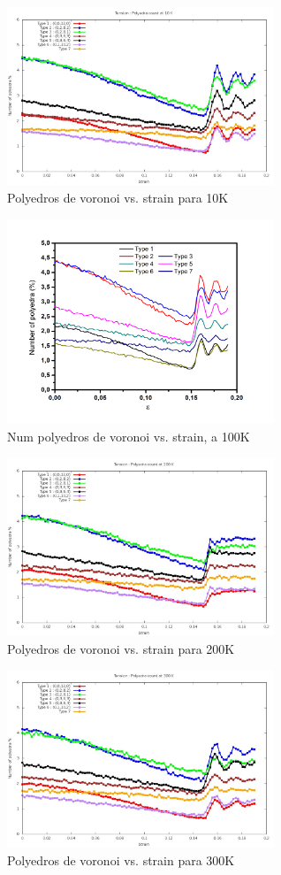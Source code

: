 \documentclass[10pt, oneside]{article} %
\begin{document}
\begin{figure}[H]
\centering
\includegraphics[width=8cm]{Figures/Tens_Polyedra_10K.jpeg}
\caption{Polyedros de voronoi vs. strain para 10K}
\end{figure}

\begin{figure}[H]
\centering
\includegraphics[width=8cm]{Figures/Polyedra_Vs_Strain_100K_TEN.png}
\caption{Num polyedros de voronoi vs. strain, a 100K}
\end{figure}

\begin{figure}[H]
\centering
\includegraphics[width=8cm]{Figures/Tens_Polyedra_200K.jpeg}
\caption{Polyedros de voronoi vs. strain para 200K}
\end{figure}

\begin{figure}[H]
\centering
\includegraphics[width=8cm]{Figures/Tens_Polyedra_300K.jpeg}
\caption{Polyedros de voronoi vs. strain para 300K}
\end{figure}
\end{document}
